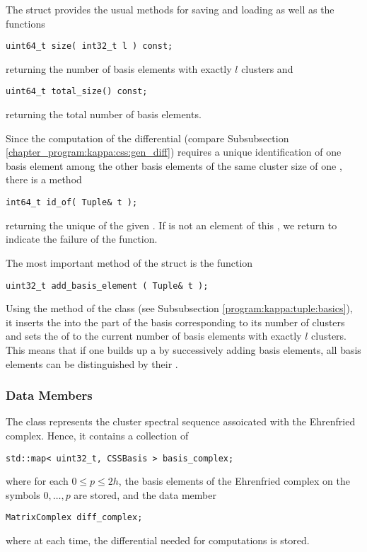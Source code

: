 The struct  provides the usual methods for saving and loading as well as the functions
\begin{lstlisting}
uint64_t size( int32_t l ) const;
\end{lstlisting}
returning the number of basis elements with exactly $l$ clusters and 
\begin{lstlisting}
uint64_t total_size() const;
\end{lstlisting}
returning the total number of basis elements.

Since the computation of the differential (compare Subsubsection \ref{chapter_program:kappa:css:gen_diff}) requires 
a unique identification of one basis element among the other basis elements of the same cluster size of one , 
there is a method
\begin{lstlisting}
int64_t id_of( Tuple& t );
\end{lstlisting} 
returning the unique  of the given  . 
If  is not an element of this , we return  to indicate the failure of the function.

The most important method of the struct  is the function
\begin{lstlisting}
uint32_t add_basis_element ( Tuple& t );
\end{lstlisting}

Using the method  of the class  (see Subsubsection \ref{program:kappa:tuple:basics}),
it inserts the   into the part of the basis corresponding to its number of clusters
and sets the  of  to the current number of basis elements with exactly $l$ clusters. 
This means that if one builds up a  by successively adding basis elements,
all basis elements can be distinguished by their .

\subsubsection{Data Members}
\label{chapter_program:kappa:css:data_members}

The class  represents the cluster spectral sequence assoicated with the Ehrenfried complex.
Hence, it contains a collection of  
\begin{lstlisting}
std::map< uint32_t, CSSBasis > basis_complex;
\end{lstlisting}
where for each $0 \leq p \leq 2h$, the basis elements of the Ehrenfried complex on the symbols $0, \dotsc, p$ are stored,
and the data member
\begin{lstlisting}
MatrixComplex diff_complex;
\end{lstlisting}
where at each time, the differential needed for computations is stored.

